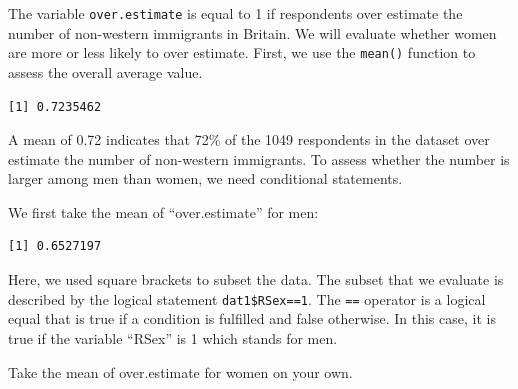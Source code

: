\documentclass[]{article}
\newenvironment{Shaded}{\begin{snugshade}}{\end{snugshade}}
\newcommand{\DecValTok}[1]{\textcolor[rgb]{0.00,0.00,0.81}{#1}}
\newcommand{\KeywordTok}[1]{\textcolor[rgb]{0.13,0.29,0.53}{\textbf{#1}}}
\newcommand{\NormalTok}[1]{#1}
\newcommand{\OperatorTok}[1]{\textcolor[rgb]{0.81,0.36,0.00}{\textbf{#1}}}
\newcommand{\StringTok}[1]{\textcolor[rgb]{0.31,0.60,0.02}{#1}}
\begin{document}
The variable \texttt{over.estimate} is equal to 1 if respondents over estimate the number of non-western immigrants in Britain. We will evaluate whether women are more or less likely to over estimate. First, we use the \texttt{mean()} function to assess the overall average value.

\begin{Shaded}
\end{Shaded}

\begin{verbatim}
[1] 0.7235462
\end{verbatim}

A mean of 0.72 indicates that 72\% of the 1049 respondents in the dataset over estimate the number of non-western immigrants. To assess whether the number is larger among men than women, we need conditional statements.

We first take the mean of ``over.estimate'' for men:

\begin{Shaded}
\end{Shaded}

\begin{verbatim}
[1] 0.6527197
\end{verbatim}

Here, we used square brackets to subset the data. The subset that we evaluate is described by the logical statement \texttt{dat1\$RSex==1}. The \texttt{==} operator is a logical equal that is true if a condition is fulfilled and false otherwise. In this case, it is true if the variable ``RSex'' is 1 which stands for men.

Take the mean of over.estimate for women on your own.

\begin{Shaded}
\end{Shaded}
\end{document}
